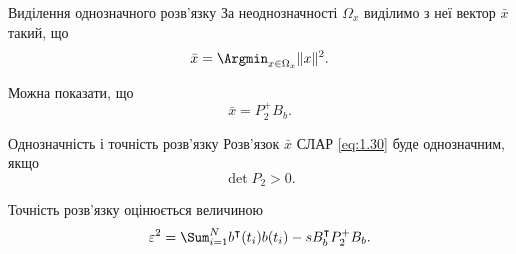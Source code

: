 \begin{mframe}{Виділення однозначного розв'язку}
    За неоднозначності $\Omega_x$ виділимо з неї вектор $\bar x$ такий, що
    \begin{equation}
        \label{eq:1.32}
        \bar x = \Argmin_{x \in \Omega_x} \|x\|^2.
    \end{equation}
    
    Можна показати, що
    \begin{equation}
        \label{eq:1.27b}
        \bar x = P_2^+ B_b.
    \end{equation}
\end{mframe}

\begin{mframe}{Однозначність і точність розв'язку}
    Розв'язок $\bar x$ СЛАР \eqref{eq:1.30} буде однозначним, якщо
    \begin{equation}
        \label{eq:1.33}
        \det P_2 > 0.
    \end{equation}

    Точність розв'язку оцінюється величиною
    \begin{equation}
        \label{eq:1.34}
        \varepsilon^2 = \Sum_{i = 1}^N b^\intercal(t_i) b(t_i) - 
        sB_b^\intercal P_2^+ B_b.
    \end{equation}
\end{mframe}
